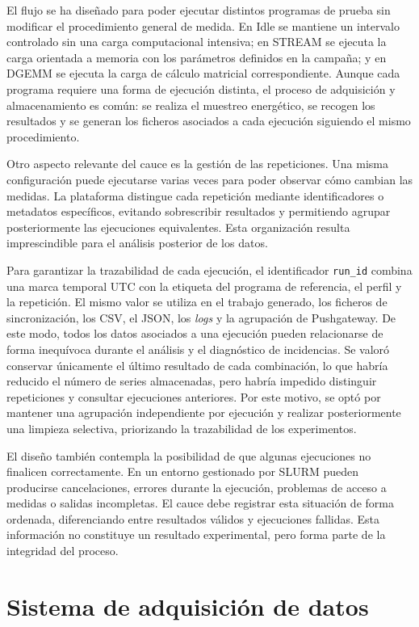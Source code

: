 El flujo se ha diseñado para poder ejecutar distintos programas de prueba sin modificar el procedimiento general de medida. En Idle se mantiene un intervalo controlado sin una carga computacional intensiva; en STREAM se ejecuta la carga orientada a memoria con los parámetros definidos en la campaña; y en DGEMM se ejecuta la carga de cálculo matricial correspondiente. Aunque cada programa requiere una forma de ejecución distinta, el proceso de adquisición y almacenamiento es común: se realiza el muestreo energético, se recogen los resultados y se generan los ficheros asociados a cada ejecución siguiendo el mismo procedimiento.

Otro aspecto relevante del cauce es la gestión de las repeticiones. Una misma configuración puede ejecutarse varias veces para poder observar cómo cambian las medidas. La plataforma distingue cada repetición mediante identificadores o metadatos específicos, evitando sobrescribir resultados y permitiendo agrupar posteriormente las ejecuciones equivalentes. Esta organización resulta imprescindible para el análisis posterior de los datos.

Para garantizar la trazabilidad de cada ejecución, el identificador \texttt{run\_id} combina una marca temporal UTC con la etiqueta del programa de referencia, el perfil y la repetición. El mismo valor se utiliza en el trabajo generado, los ficheros de sincronización, los CSV, el JSON, los \emph{logs} y la agrupación de Pushgateway. De este modo, todos los datos asociados a una ejecución pueden relacionarse de forma inequívoca durante el análisis y el diagnóstico de incidencias. Se valoró conservar únicamente el último resultado de cada combinación, lo que habría reducido el número de series almacenadas, pero habría impedido distinguir repeticiones y consultar ejecuciones anteriores. Por este motivo, se optó por mantener una agrupación independiente por ejecución y realizar posteriormente una limpieza selectiva, priorizando la trazabilidad de los experimentos.

El diseño también contempla la posibilidad de que algunas ejecuciones no finalicen correctamente. En un entorno gestionado por SLURM pueden producirse cancelaciones, errores durante la ejecución, problemas de acceso a medidas o salidas incompletas. El cauce debe registrar esta situación de forma ordenada, diferenciando entre resultados válidos y ejecuciones fallidas. Esta información no constituye un resultado experimental, pero forma parte de la integridad del proceso.

\section{Sistema de adquisición de datos}
\label{sec:adquisicion-implementacion}

